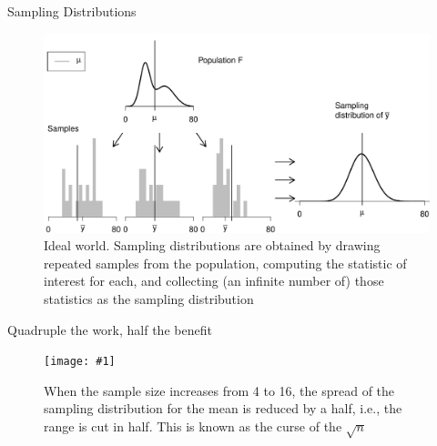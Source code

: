 \documentclass{beamer}\usepackage[]{graphicx}\usepackage[]{color}
\newenvironment{knitrout}{}{} %
\newcommand {\framedgraphiccaption}[2] {
	\begin{figure}
		\centering
		\texttt{[image: \#1]}
		\caption{#2}
	\end{figure}
}
\begin{document}
\begin{frame}[fragile]{Sampling Distributions}

\begin{knitrout}\scriptsize
{}\color{fgcolor}\begin{figure}

{\centering \includegraphics[width=1\linewidth]{figure/unnamed-chunk-1-1} 

}

\caption[Ideal world]{Ideal world. Sampling distributions are obtained by drawing repeated samples from the population, computing the statistic of interest for each, and collecting (an infinite number of) those statistics as the sampling distribution}\label{fig:unnamed-chunk-1}
\end{figure}


\end{knitrout}

\end{frame}


\begin{frame}[fragile]{Quadruple the work, half the benefit}

\framedgraphiccaption{../sampling_dist/ROOToceanAll.png}{When the sample size increases from 4 to 16, the spread of the sampling distribution for the mean is reduced by a half, i.e., the range is cut in half. This is known as the curse of the $\sqrt{n}$}
\end{frame}
\end{document}
